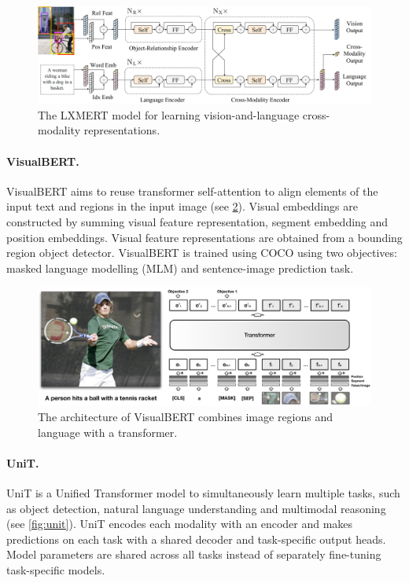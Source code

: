 \begin{figure}[ht]
    \centering
    \includegraphics[width=\linewidth]{images/models/lxmert.pdf}
    \caption{The LXMERT model for learning vision-and-language cross-modality representations.}
    \label{fig:lxmert}
\end{figure}

\paragraph{VisualBERT.} VisualBERT \cite{li2019visualbert} aims to reuse transformer self-attention to align elements of the input text and regions in the input image (see \cref{fig:visualbert}). Visual embeddings are constructed by summing visual feature representation, segment embedding and position embeddings. Visual feature representations are obtained from a bounding region object detector. VisualBERT is trained using COCO using two objectives: masked language modelling (MLM) and sentence-image prediction task.

\begin{figure}[ht]
    \centering
    \includegraphics[width=\linewidth]{images/models/visualbert.pdf}
    \caption{The architecture of VisualBERT combines image regions and language with a transformer.}
    \label{fig:visualbert}
\end{figure}

\paragraph{UniT.} UniT \cite{hu2021unit} is a Unified Transformer model to simultaneously learn multiple tasks, such as object detection, natural language understanding and multimodal reasoning (see \cref{fig:unit}). UniT encodes each modality with an encoder and makes predictions on each task with a shared decoder and task-specific output heads. Model parameters are shared across all tasks instead of separately fine-tuning task-specific models.

